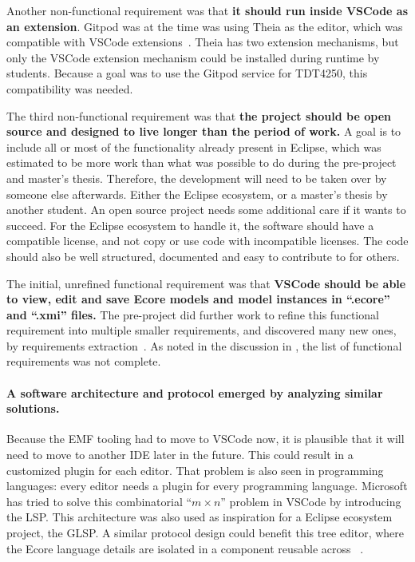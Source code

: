 Another non-functional requirement was that \textbf{it should run inside \gls{VSCode} as an extension}.
Gitpod was at the time was using \gls{Theia} as the editor, which was compatible with \gls{VSCode} extensions~\cite{rekstadModelingEnvironmentCloud2020}.
\Gls{Theia} has two extension mechanisms, but only the \gls{VSCode} extension mechanism could be installed during runtime by students\cite{rekstadModelingEnvironmentCloud2020}.
Because a goal was to use the Gitpod service for \gls{TDT4250}, this compatibility was needed.


The third non-functional requirement was that \textbf{the project should be \gls{open source} and designed to live longer than the period of work.}
A goal is to include all or most of the functionality already present in \gls{Eclipse}, which was estimated to be more work than what was possible to do during the pre-project and master's thesis.
Therefore, the development will need to be taken over by someone else afterwards.
Either the Eclipse ecosystem, or a master's thesis by another student.
An \gls{open source} project needs some additional care if it wants to succeed.
For the Eclipse ecosystem to handle it, the software should have a compatible license, and not copy or use code with incompatible licenses.
The code should also be well structured, documented and easy to contribute to for others.


The initial, unrefined functional requirement was that \textbf{\gls{VSCode} should be able to view, edit and save \gls{Ecore} models and model instances in ``.ecore'' and ``.xmi'' files.}
The pre-project did further work to refine this functional requirement into multiple smaller requirements, and discovered many new ones, by requirements extraction~\cite[p.~47,48]{rekstadModelingEnvironmentCloud2020}.
As noted in the discussion in \cite[p.~51]{rekstadModelingEnvironmentCloud2020}, the list of functional requirements was not complete.


\paragraph{A software architecture and protocol emerged by analyzing similar solutions.}
Because the \acrshort{EMF} tooling had to move to \gls{VSCode} now, it is plausible that it will need to move to another \acrshort{IDE} later in the future.
This could result in a customized plugin for each editor.
That problem is also seen in programming languages: every editor needs a plugin for every programming language.
Microsoft has tried to solve this combinatorial ``\(m{\times}n\)'' problem in \gls{VSCode} by introducing the \acrfull{LSP}.
This architecture was also used as inspiration for a Eclipse ecosystem project, the \acrfull{GLSP}.
A similar protocol design could benefit this tree editor, where the \gls{Ecore} language details are isolated in a component reusable across ~\cite{rekstadModelingEnvironmentCloud2020}.


